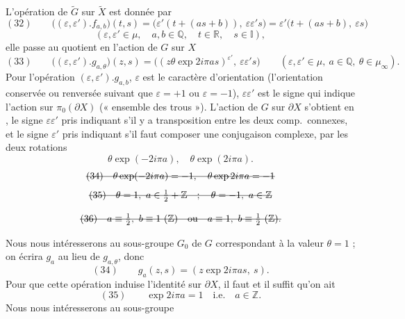 \documentclass[11pt,a4paper]{article}
\begin{document}
L'opération de $\widetilde{G}$ sur $\widetilde{X}$ est donnée par
\[
(32)\qquad \bigl((\varepsilon,\varepsilon').f_{a,b}\bigr)(t,s)=\bigl(\varepsilon'(t+(as+b)),\ \varepsilon\varepsilon's\bigr)=\varepsilon'\bigl(t+(as+b),\ \varepsilon s\bigr)
\]
\[
(\varepsilon,\varepsilon'\in\mu,\quad a,b\in\mathbb{Q},\quad t\in\mathbb{R},\quad s\in\mathbb{I}),
\]
elle passe au quotient en l'action de $G$ sur $X$
\[
(33)\qquad \bigl((\varepsilon,\varepsilon').g_{a,\theta}\bigr)(z,s)=\bigl((z\theta\exp 2i\pi as)^{\varepsilon'},\ \varepsilon\varepsilon's\bigr)
\qquad(\varepsilon,\varepsilon'\in\mu,\ a\in\mathbb{Q},\ \theta\in\mu_\infty).
\]
Pour l'opération $(\varepsilon,\varepsilon').g_{a,b}$, $\varepsilon$ est le caractère d'orientation (l'orientation conservée ou renversée suivant que $\varepsilon=+1$ ou $\varepsilon=-1$), $\varepsilon\varepsilon'$ est le signe qui indique l'action sur $\pi_0(\partial X)$ (« ensemble des trous »). L'action de $G$ sur $\partial X$ s'obtient en , le signe $\varepsilon\varepsilon'$ pris  indiquant s'il y a transposition entre les deux comp.\ connexes, et  le signe $\varepsilon'$ pris indiquant s'il faut composer  une conjugaison complexe, par les deux rotations
\[
\theta\exp(-2i\pi a),\quad \theta\exp(2i\pi a).
\]
\[
\text{\struck{$(34)\quad \theta\exp(-2i\pi a)=-1,\quad \theta\exp 2i\pi a=-1$}}
\]
  
\[
\text{\struck{$(35)\quad \theta=1,\ a\in\tfrac12+\mathbb{Z}\quad;\quad \theta=-1,\ a\in\mathbb{Z}$}}
\]

\[
\text{\struck{$(36)\quad a\equiv\tfrac12,\ b\equiv1\ (\mathbb{Z})\quad\text{ou}\quad a\equiv1,\ b\equiv\tfrac12\ (\mathbb{Z}).$}}
\]

Nous nous intéresserons au sous-groupe $G_0$ de $G$ correspondant à la valeur $\theta=1$ ; on écrira $g_a$ au lieu de $g_{a,\theta}$, donc
\[
(34)\qquad g_a(z,s)=(z\exp 2i\pi as,\ s).
\]
Pour que cette opération induise l'identité sur $\partial X$, il faut et il suffit qu'on ait
\[
(35)\qquad \exp 2i\pi a=1\quad\text{i.e.}\quad a\in\mathbb{Z}.
\]
Nous nous intéresserons au sous-groupe
\end{document}
